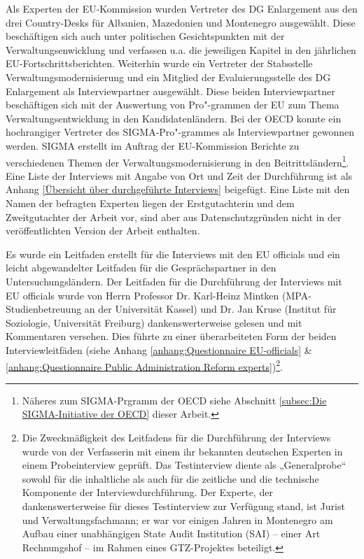 Als Experten der EU-Kommission wurden Vertreter des DG Enlargement aus den drei Country-Desks für Albanien, Mazedonien und Montenegro ausgewählt. Diese beschäftigen sich auch unter politischen Gesichtspunkten mit der Verwaltungsenwicklung und verfassen u.a. die jeweiligen Kapitel in den jährlichen EU-Fortschrittsberichten. Weiterhin wurde ein Vertreter der Stabsstelle Verwaltungsmodernisierung und ein Mitglied der Evaluierungsstelle des DG Enlargement als Interviewpartner ausgewählt. Diese beiden Interviewpartner beschäftigen sich mit der Auswertung von Pro"-grammen der EU zum Thema Verwaltungsentwicklung in den Kandidatenländern. Bei der OECD konnte ein hochrangiger Vertreter des SIGMA-Pro"-grammes als Interviewpartner gewonnen werden. SIGMA erstellt im Auftrag der EU-Kommission Berichte zu verschiedenen Themen der Verwaltungsmodernisierung in den Beitrittsländern\footnote{Näheres zum SIGMA-Prgramm der OECD siehe Abschnitt \ref{subsec:Die SIGMA-Initiative der OECD} dieser Arbeit.}. Eine Liste der Interviews mit Angabe von Ort und Zeit der Durchführung ist als Anhang \ref{Übersicht über durchgeführte Interviews} beigefügt. Eine Liste mit den Namen der befragten Experten liegen der Erstgutachterin und dem Zweitgutachter der Arbeit vor, sind aber aus Datenschutzgründen nicht in der veröffentlichten Version der Arbeit enthalten.\par
Es wurde ein Leitfaden erstellt für die Interviews mit den EU officials und ein leicht abgewandelter Leitfaden für die Gesprächspartner in den Untersuchungsländern. Der Leitfaden für die Durchführung der Interviews mit EU officials wurde von Herrn Professor Dr. Karl-Heinz Mintken (MPA-Studienbetreuung an der Universität Kassel) und Dr. Jan Kruse (Institut für Soziologie, Universität Freiburg) dankenswerterweise gelesen und mit Kommentaren versehen. Dies führte zu einer überarbeiteten Form der beiden Interviewleitfäden (siehe Anhang \ref{anhang:Questionnaire EU-officials} \& \ref{anhang:Questionnaire Public Administration Reform experts})\footnote{Die Zweckmäßigkeit des Leitfadens für die Durchführung der Interviews wurde von der Verfasserin mit einem ihr bekannten deutschen Experten in einem Probeinterview geprüft. Das Testinterview diente als „Generalprobe“ sowohl für die inhaltliche als auch für die zeitliche und die technische Komponente der Interviewdurchführung. Der Experte, der dankenswerterweise für dieses Testinterview zur Verfügung stand, ist Jurist und Verwaltungsfachmann; er war vor einigen Jahren in Montenegro am Aufbau einer unabhängigen State Audit Institution (SAI) – einer Art Rechnungshof – im Rahmen eines GTZ-Projektes beteiligt. }.

